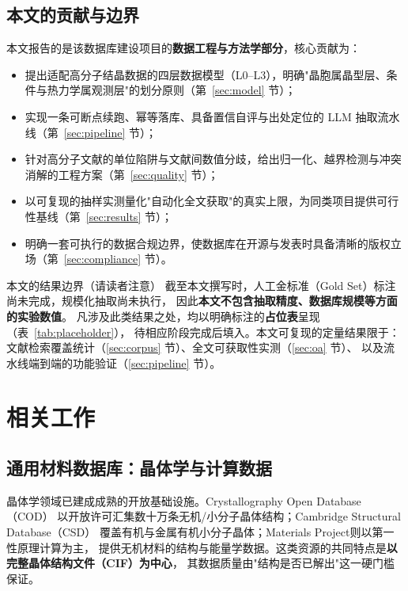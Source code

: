 \documentclass[11pt,a4paper]{ctexart}
\begin{document}
\subsection{本文的贡献与边界}

本文报告的是该数据库建设项目的\textbf{数据工程与方法学部分}，核心贡献为：
\begin{itemize}[leftmargin=2.2em]
  \item 提出适配高分子结晶数据的四层数据模型（L0--L3），明确"晶胞属晶型层、条件与热力学属观测层"的划分原则（第~\ref{sec:model} 节）；
  \item 实现一条可断点续跑、幂等落库、具备置信自评与出处定位的 LLM 抽取流水线（第~\ref{sec:pipeline} 节）；
  \item 针对高分子文献的单位陷阱与文献间数值分歧，给出归一化、越界检测与冲突消解的工程方案（第~\ref{sec:quality} 节）；
  \item 以可复现的抽样实测量化"自动化全文获取"的真实上限，为同类项目提供可行性基线（第~\ref{sec:results} 节）；
  \item 明确一套可执行的数据合规边界，使数据库在开源与发表时具备清晰的版权立场（第~\ref{sec:compliance} 节）。
\end{itemize}

\begin{warnbox}{本文的结果边界（请读者注意）}
截至本文撰写时，人工金标准（Gold Set）标注尚未完成，规模化抽取尚未执行，
因此\textbf{本文不包含抽取精度、数据库规模等方面的实验数值}。
凡涉及此类结果之处，均以明确标注的\textbf{占位表}呈现（表~\ref{tab:placeholder}），
待相应阶段完成后填入。本文可复现的定量结果限于：
文献检索覆盖统计（\ref{sec:corpus} 节）、全文可获取性实测（\ref{sec:oa} 节）、
以及流水线端到端的功能验证（\ref{sec:pipeline} 节）。
\end{warnbox}

\section{相关工作}

\subsection{通用材料数据库：晶体学与计算数据}

晶体学领域已建成成熟的开放基础设施。Crystallography Open Database（COD）\cite{grazulis2009,grazulis2011}
以开放许可汇集数十万条无机/小分子晶体结构；Cambridge Structural Database（CSD）\cite{groom2016}
覆盖有机与金属有机小分子晶体；Materials Project\cite{jain2013}则以第一性原理计算为主，
提供无机材料的结构与能量学数据。这类资源的共同特点是\textbf{以完整晶体结构文件（CIF）为中心}，
其数据质量由"结构是否已解出"这一硬门槛保证。
\end{document}
